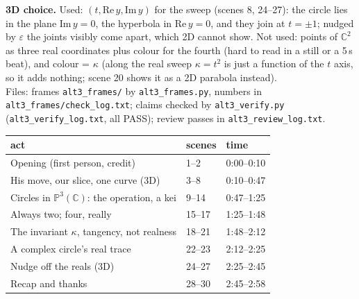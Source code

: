 \documentclass[10pt]{article}
\begin{document}
\textbf{3D choice.} Used: $(t,\mathrm{Re}\,y,\mathrm{Im}\,y)$ for the sweep (scenes 8, 24--27): the circle lies in the plane $\mathrm{Im}\,y=0$, the hyperbola in $\mathrm{Re}\,y=0$, and they join at $t=\pm1$; nudged by $\varepsilon$ the joints visibly come apart, which 2D cannot show. Not used: points of $\mathbb C^2$ as three real coordinates plus colour for the fourth (hard to read in a still or a 5\,s beat), and colour = $\kappa$ (along the real sweep $\kappa=t^2$ is just a function of the $t$ axis, so it adds nothing; scene 20 shows it as a 2D parabola instead).\\[4pt]
Files: frames \texttt{alt3\_frames/} by \texttt{alt3\_frames.py}, numbers in \texttt{alt3\_frames/check\_log.txt}; claims checked by \texttt{alt3\_verify.py} (\texttt{alt3\_verify\_log.txt}, all PASS); review passes in \texttt{alt3\_review\_log.txt}.\\[4pt]
{\small\begin{tabular}{lll}\toprule act & scenes & time\\\midrule Opening (first person, credit) & 1--2 & 0:00--0:10 \\ His move, our slice, one curve (3D) & 3--8 & 0:10--0:47 \\ Circles in $\mathbb P^3(\mathbb C)$: the operation, a kei & 9--14 & 0:47--1:25 \\ Always two; four, really & 15--17 & 1:25--1:48 \\ The invariant $\kappa$, tangency, not realness & 18--21 & 1:48--2:12 \\ A complex circle's real trace & 22--23 & 2:12--2:25 \\ Nudge off the reals (3D) & 24--27 & 2:25--2:45 \\ Recap and thanks & 28--30 & 2:45--2:58 \\\bottomrule\end{tabular}}\\[4pt]
\end{document}
